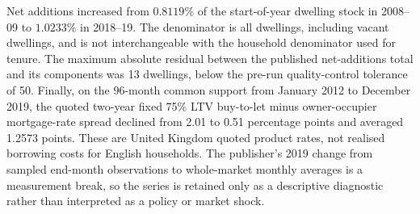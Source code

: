 Net additions increased from $0.8119\%$ of the start-of-year dwelling stock in
2008--09 to $1.0233\%$ in 2018--19.  The denominator is all dwellings,
including vacant dwellings, and is not interchangeable with the household
denominator used for tenure.  The maximum absolute residual between the
published net-additions total and its components was 13 dwellings, below the
pre-run quality-control tolerance of 50.  Finally, on the 96-month common
support from January 2012 to December 2019, the quoted two-year fixed 75\% LTV
buy-to-let minus owner-occupier mortgage-rate spread declined from 2.01 to
0.51 percentage points and averaged 1.2573 points.  These are United Kingdom
quoted product rates, not realised borrowing costs for English households.  The
publisher's 2019 change from sampled end-month observations to whole-market
monthly averages is a measurement break, so the series is retained only as a
descriptive diagnostic rather than interpreted as a policy or market shock.

